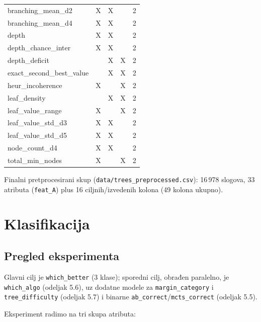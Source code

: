 \documentclass[12pt, a4paper]{article}
\begin{document}
\begin{table}[H]
\begin{tabular}{lcccc}
branching\_mean\_d2      & X & X &   & 2 \\
branching\_mean\_d4      & X & X &   & 2 \\
depth                    & X & X &   & 2 \\
depth\_chance\_inter     & X & X &   & 2 \\
depth\_deficit           &   & X & X & 2 \\
exact\_second\_best\_value &  & X & X & 2 \\
heur\_incoherence        & X &   & X & 2 \\
leaf\_density            &   & X & X & 2 \\
leaf\_value\_range       & X &   & X & 2 \\
leaf\_value\_std\_d3     & X & X &   & 2 \\
leaf\_value\_std\_d5     & X & X &   & 2 \\
node\_count\_d4          & X & X &   & 2 \\
total\_min\_nodes        & X &   & X & 2 \\
\bottomrule
\end{tabular}
\end{table}

Finalni pretprocesirani skup (\texttt{data/trees\_preprocessed.csv}): 16\,978 slogova, 33
atributa (\texttt{feat\_A}) plus 16 ciljnih/izvedenih kolona (49 kolona ukupno).

\section{Klasifikacija}

\subsection{Pregled eksperimenta}

Glavni cilj je \texttt{which\_better} (3 klase); sporedni cilj, obrađen paralelno, je
\texttt{which\_algo} (odeljak 5.6), uz dodatne modele za \texttt{margin\_category} i
\texttt{tree\_difficulty} (odeljak 5.7) i binarne \texttt{ab\_correct}/\texttt{mcts\_correct}
(odeljak 5.5).

Eksperiment radimo na tri skupa atributa:
\end{document}
